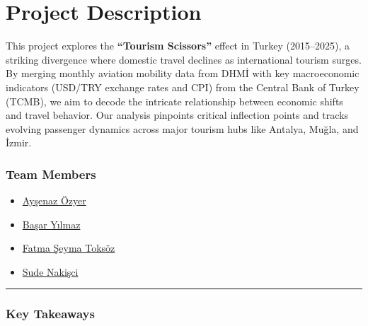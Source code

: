 \documentclass[
  11pt,
  a4paper,
  DIV=11,
  numbers=noendperiod]{scrartcl}
\providecommand{\tightlist}{%
  \setlength{\itemsep}{0pt}\setlength{\parskip}{0pt}}
\begin{document}
\section{Project Description}\label{project-description-1}

This project explores the \textbf{``Tourism Scissors''} effect in Turkey
(2015--2025), a striking divergence where domestic travel declines as
international tourism surges. By merging monthly aviation mobility data
from DHMİ with key macroeconomic indicators (USD/TRY exchange rates and
CPI) from the Central Bank of Turkey (TCMB), we aim to decode the
intricate relationship between economic shifts and travel behavior. Our
analysis pinpoints critical inflection points and tracks evolving
passenger dynamics across major tourism hubs like Antalya, Muğla, and
İzmir.

\subsubsection{Team Members}\label{team-members-1}

\begin{itemize}
\tightlist
\item
  \href{https://emu-hacettepe-analytics.github.io/emu430-spring2026-aysenazozyer/}{Ayşenaz
  Özyer}
\item
  \href{https://emu-hacettepe-analytics.github.io/emu430-spring2026-BasarYiilmaz/}{Başar
  Yılmaz}
\item
  \href{https://emu-hacettepe-analytics.github.io/emu430-spring2026-b2220469019/}{Fatma
  Şeyma Toksöz}
\item
  \href{https://emu-hacettepe-analytics.github.io/emu430-spring2026-sudenakisci/}{Sude
  Nakişci}
\end{itemize}

\begin{center}\rule{0.5\linewidth}{0.5pt}\end{center}

\subsubsection{Key Takeaways}\label{key-takeaways-1}
\end{document}
